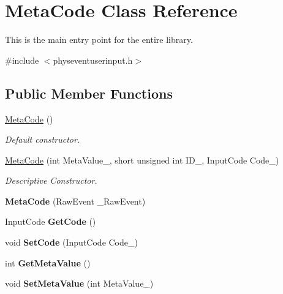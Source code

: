 \hypertarget{classMetaCode}{
\section{MetaCode Class Reference}
\label{d7/d72/classMetaCode}
}


This is the main entry point for the entire library.  


{\ttfamily \#include $<$physeventuserinput.h$>$}\subsection*{Public Member Functions}
\begin{DoxyCompactItemize}
\item 
\hyperlink{classMetaCode_a6d4637b2894e5a2d46577c08259a2416}{MetaCode} ()
\begin{DoxyCompactList}\small\item\em Default constructor. \item\end{DoxyCompactList}\item 
\hyperlink{classMetaCode_a76bba215580768ab22c505ea18b2ec6d}{MetaCode} (int MetaValue\_\-, short unsigned int ID\_\-, InputCode Code\_\-)
\begin{DoxyCompactList}\small\item\em Descriptive Constructor. \item\end{DoxyCompactList}\item 
\hypertarget{classMetaCode_ad0a739796fa1de2991c196d8ee7b19b2}{
{\bfseries MetaCode} (RawEvent \_\-RawEvent)}
\label{d7/d72/classMetaCode_ad0a739796fa1de2991c196d8ee7b19b2}

\item 
\hypertarget{classMetaCode_a9438d04aa38086baa1c5ccd79510c0fb}{
InputCode {\bfseries GetCode} ()}
\label{d7/d72/classMetaCode_a9438d04aa38086baa1c5ccd79510c0fb}

\item 
\hypertarget{classMetaCode_a24f0c5469a12ccc59fcf3b830e6cfc27}{
void {\bfseries SetCode} (InputCode Code\_\-)}
\label{d7/d72/classMetaCode_a24f0c5469a12ccc59fcf3b830e6cfc27}

\item 
\hypertarget{classMetaCode_a6a33ef9b7e2414ecfd97aadb14eca2de}{
int {\bfseries GetMetaValue} ()}
\label{d7/d72/classMetaCode_a6a33ef9b7e2414ecfd97aadb14eca2de}

\item 
\hypertarget{classMetaCode_a308404d4eb64627d02ab41dd5029c9c8}{
void {\bfseries SetMetaValue} (int MetaValue\_\-)}
\label{d7/d72/classMetaCode_a308404d4eb64627d02ab41dd5029c9c8}


\end{DoxyCompactItemize}
